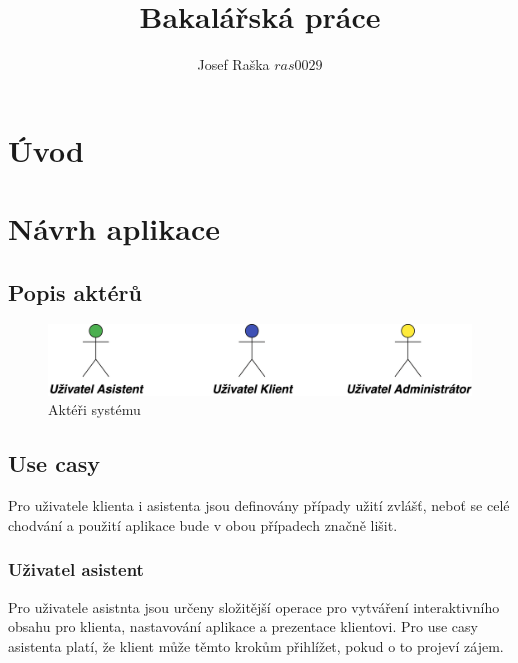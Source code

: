 \documentclass{article}
\title{Bakalářská práce}
\author{Josef Raška \(ras0029\)}
\numberwithin{equation}{section}
\begin{document}
{}

\tableofcontents
\listoffigures
\listoftables

\newpage

\section{Úvod}

\section{Návrh aplikace}
\subsection{Popis aktérů}
\begin{figure}[H]
        \centering
                \includegraphics[scale=0.15]{img/actors.png}
        \caption{Aktéři systému}
        \label{fig:actors}
\end{figure}

\subsection{Use casy}
Pro uživatele klienta i asistenta jsou definovány případy užití zvlášť, neboť se celé chodvání
a použití aplikace bude v obou případech značně lišit.

\subsubsection{Uživatel asistent}
Pro uživatele asistnta jsou určeny složitější operace pro vytváření interaktivního obsahu pro klienta,
nastavování aplikace a prezentace klientovi. Pro use casy asistenta platí, že klient může těmto
krokům přihlížet, pokud o to projeví zájem.
\end{document}
